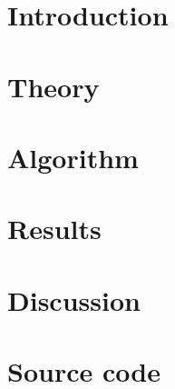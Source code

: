 \documentclass[a4paper, 12pt, english]{article}
\author{Kristoffer Brækken, Vedad Hodzic, Paul Magnus Sørensen-Clark}
\begin{document}
\begin{titlepage}
    \thispagestyle{empty}
    
\end{titlepage}

\section{Introduction}


\section{Theory}

\section{Algorithm}
% 

\section{Results}


\section{Discussion}

\section{Source code}
\end{document}
